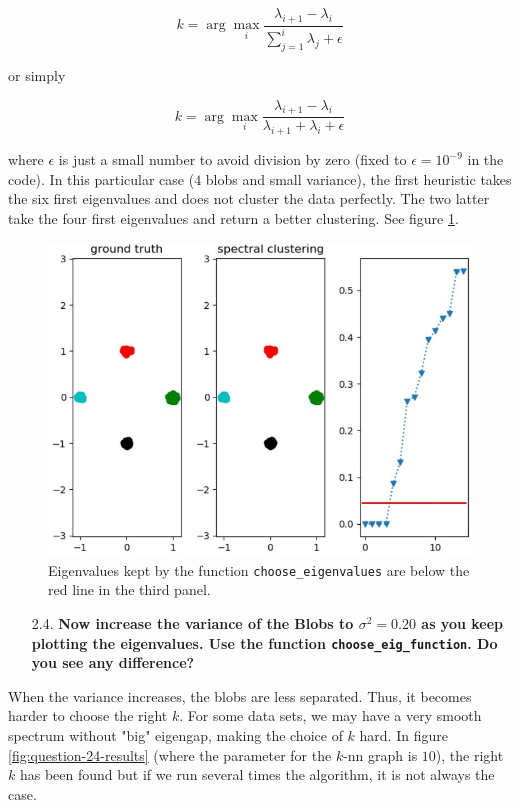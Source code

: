 \documentclass[a4paper, 11pt]{report}
\begin{document}
    \[ k = \arg \max_{i} \frac{\lambda_{i+1} - \lambda_{i}}{\sum_{j=1}^{i} \lambda_{j} + \epsilon} \]

    or simply

    \[ k = \arg \max_{i} \frac{\lambda_{i+1} - \lambda_{i}}{\lambda_{i+1} + \lambda_{i} + \epsilon} \]

    where $\epsilon$ is just a small number to avoid division by zero (fixed to $\epsilon = 10^{-9}$ in the code). In this particular case ($4$ blobs and small variance), the first heuristic takes the six first eigenvalues and does not cluster the data perfectly. The two latter take the four first eigenvalues and return a better clustering. See figure \ref{fig:find-the-bend}.

    \begin{figure}[!h]
        \centering
        \includegraphics[scale=0.6]{images/find_the_bend.jpg}
        \caption{Eigenvalues kept by the function \texttt{choose\_eigenvalues} are below the red line in the third panel.}
        \label{fig:find-the-bend}
    \end{figure}

    \pagebreak

\begin{itemize}
    \item[2.4.] \textbf{Now increase the variance of the Blobs to $\sigma^{2} = 0.20$ as you keep plotting the eigenvalues. Use the function \texttt{choose\_eig\_function}. Do you see any difference?}
\end{itemize}

    When the variance increases, the blobs are less separated. Thus, it becomes harder to choose the right $k$. For some data sets, we may have a very smooth spectrum without "big" eigengap, making the choice of $k$ hard. In figure \ref{fig:question-24-results} (where the parameter for the $k$-nn graph is $10$), the right $k$ has been found but if we run several times the algorithm, it is not always the case.
\end{document}
